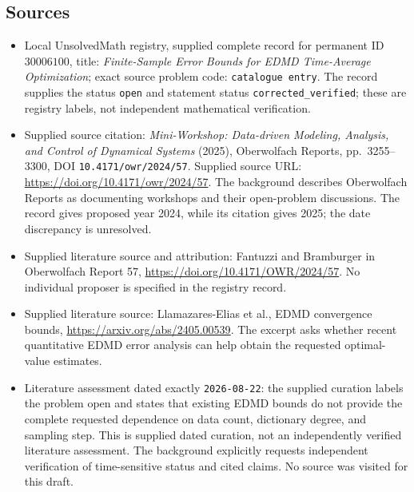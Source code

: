 \documentclass[11pt]{article}
\begin{document}
\subsection{Sources}
\begin{itemize}
\item Local UnsolvedMath registry, supplied complete record for permanent ID \(30006100\), title: \emph{Finite-Sample Error Bounds for EDMD Time-Average Optimization}; exact source problem code: \texttt{catalogue entry}. The record supplies the status \texttt{open} and statement status \texttt{corrected\_verified}; these are registry labels, not independent mathematical verification.
\item Supplied source citation: \emph{Mini-Workshop: Data-driven Modeling, Analysis, and Control of Dynamical Systems} (2025), Oberwolfach Reports, pp.\ 3255--3300, DOI \texttt{10.4171/owr/2024/57}. Supplied source URL: \url{https://doi.org/10.4171/owr/2024/57}. The background describes Oberwolfach Reports as documenting workshops and their open-problem discussions. The record gives proposed year 2024, while its citation gives 2025; the date discrepancy is unresolved.
\item Supplied literature source and attribution: Fantuzzi and Bramburger in Oberwolfach Report 57, \url{https://doi.org/10.4171/OWR/2024/57}. No individual proposer is specified in the registry record.
\item Supplied literature source: Llamazares-Elias et al., EDMD convergence bounds, \url{https://arxiv.org/abs/2405.00539}. The excerpt asks whether recent quantitative EDMD error analysis can help obtain the requested optimal-value estimates.
\item Literature assessment dated exactly \texttt{2026-08-22}: the supplied curation labels the problem open and states that existing EDMD bounds do not provide the complete requested dependence on data count, dictionary degree, and sampling step. This is supplied dated curation, not an independently verified literature assessment. The background explicitly requests independent verification of time-sensitive status and cited claims. No source was visited for this draft.
\end{itemize}
\end{document}
